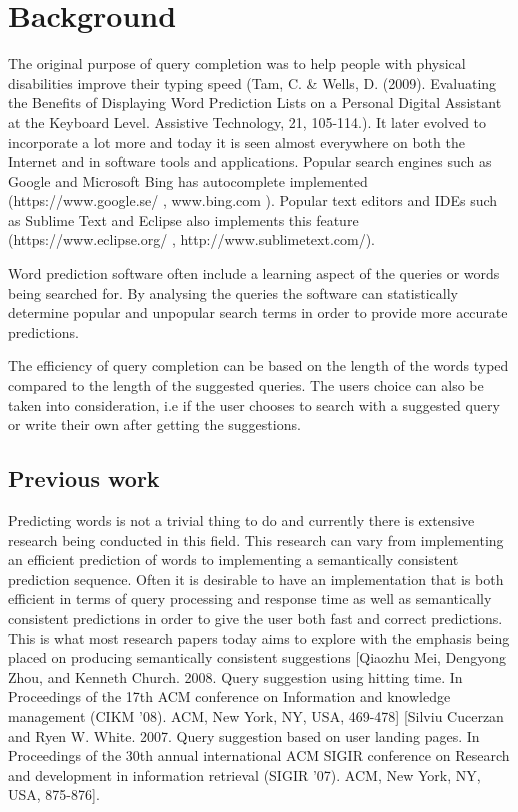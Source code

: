 \section{Background}\label{background}

The original purpose of query completion was to help people with physical disabilities improve their typing speed (Tam, C. \& Wells, D. (2009). Evaluating the Benefits of Displaying Word Prediction Lists on a Personal Digital Assistant at the Keyboard Level. Assistive Technology, 21, 105-114.). It later evolved to incorporate a lot more and today it is seen almost everywhere on both the Internet and in software tools and applications. Popular search engines such as Google and Microsoft Bing has autocomplete implemented (https://www.google.se/ , www.bing.com ). Popular text editors and IDEs such as Sublime Text and Eclipse also implements this feature (https://www.eclipse.org/ , http://www.sublimetext.com/).

Word prediction software often include a learning aspect of the queries or words being searched for. By analysing the queries the software can statistically determine popular and unpopular search terms in order to provide more accurate predictions.

The efficiency of query completion can be based on the length of the words typed compared to the length of the suggested queries. The users choice can also be taken into consideration, i.e if the user chooses to search with a suggested query or write their own after getting the suggestions.

\subsection{Previous work}\label{previouswork}

Predicting words is not a trivial thing to do and currently there is extensive research being conducted in this field. This research can vary from implementing an efficient prediction of words to implementing a semantically consistent prediction sequence. Often it is desirable to have an implementation that is both efficient in terms of query processing and response time as well as semantically consistent predictions in order to give the user both fast and correct predictions. This is what most research papers today aims to explore with the emphasis being placed on producing semantically consistent suggestions [Qiaozhu Mei, Dengyong Zhou, and Kenneth Church. 2008. Query suggestion using hitting time. In Proceedings of the 17th ACM conference on Information and knowledge management (CIKM '08). ACM, New York, NY, USA, 469-478] 
[Silviu Cucerzan and Ryen W. White. 2007. Query suggestion based on user landing pages. In Proceedings of the 30th annual international ACM SIGIR conference on Research and development in information retrieval (SIGIR '07). ACM, New York, NY, USA, 875-876].

